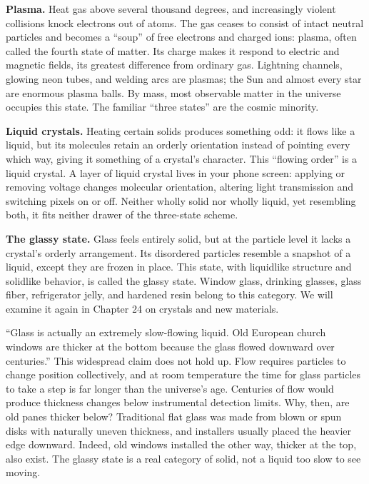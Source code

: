\textbf{Plasma.} Heat gas above several thousand degrees, and increasingly violent collisions knock electrons out of atoms. The gas ceases to consist of intact neutral particles and becomes a ``soup'' of free electrons and charged ions: plasma, often called the fourth state of matter. Its charge makes it respond to electric and magnetic fields, its greatest difference from ordinary gas. Lightning channels, glowing neon tubes, and welding arcs are plasmas; the Sun and almost every star are enormous plasma balls. By mass, most observable matter in the universe occupies this state. The familiar ``three states'' are the cosmic minority.

\textbf{Liquid crystals.} Heating certain solids produces something odd: it flows like a liquid, but its molecules retain an orderly orientation instead of pointing every which way, giving it something of a crystal's character. This ``flowing order'' is a liquid crystal. A layer of liquid crystal lives in your phone screen: applying or removing voltage changes molecular orientation, altering light transmission and switching pixels on or off. Neither wholly solid nor wholly liquid, yet resembling both, it fits neither drawer of the three-state scheme.

\textbf{The glassy state.} Glass feels entirely solid, but at the particle level it lacks a crystal's orderly arrangement. Its disordered particles resemble a snapshot of a liquid, except they are frozen in place. This state, with liquidlike structure and solidlike behavior, is called the glassy state. Window glass, drinking glasses, glass fiber, refrigerator jelly, and hardened resin belong to this category. We will examine it again in Chapter 24 on crystals and new materials.

\begin{wuqu}
``Glass is actually an extremely slow-flowing liquid. Old European church windows are thicker at the bottom because the glass flowed downward over centuries.'' This widespread claim does not hold up. Flow requires particles to change position collectively, and at room temperature the time for glass particles to take a step is far longer than the universe's age. Centuries of flow would produce thickness changes below instrumental detection limits. Why, then, are old panes thicker below? Traditional flat glass was made from blown or spun disks with naturally uneven thickness, and installers usually placed the heavier edge downward. Indeed, old windows installed the other way, thicker at the top, also exist. The glassy state is a real category of solid, not a liquid too slow to see moving.
\end{wuqu}


